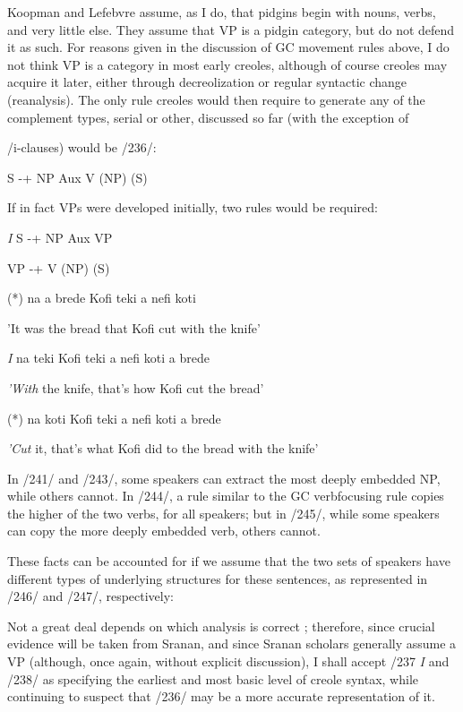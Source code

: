 Koopman and Lefebvre assume, as I do, that pidgins begin with
nouns, verbs, and very little else. They assume that VP is a pidgin category, but do not defend it as such. For reasons given in the dis\-cussion of GC movement rules above, I do not think VP is a category in most early creoles, although of course creoles may acquire it later, either through decreolization or regular syntactic change (reanalysis). The only rule creoles would then require to generate any of the comple\-ment types, serial or other, discussed so far (with the exception of

/i-clauses) would be /236/:

\ea\label{ex:236}
 S {}-+ NP Aux V (NP) (S)
\glt
\z

If in fact VPs were developed initially, two rules would be required:

\ea\label{ex:237}
 \textit{I} S {}-+ NP Aux VP
\glt
\z


\ea\label{ex:238}
 VP {}-+ V (NP) (S)
\glt
\z


\ea\label{ex:243}
 (*) na a brede Kofi teki a nefi koti
\glt
\z

'It was the bread that Kofi cut with the knife'

\ea\label{ex:244}
 \textit{I} na teki Kofi teki a nefi koti a brede
\glt
\z


\textit{'With} the knife, that's how Kofi cut the bread'

\ea\label{ex:245}
 (*) na koti Kofi teki a nefi koti a brede
\glt
\z

\textit{'Cut} it, that's what Kofi did to the bread with the knife'

In /241/ and /243/, some speakers can extract the most deeply embed\-ded NP, while others cannot. In /244/, a rule similar to the GC verb\-focusing rule copies the higher of the two verbs, for all speakers; but in /245/, while some speakers can copy the more deeply embedded verb, others cannot.

These facts can be accounted for if we assume that the two sets of speakers have different types of underlying structures for these sentences, as represented in /246/ and /247/, respectively:

Not a great deal depends on which analysis is correct ; therefore, since crucial evidence will be taken from Sranan, and since Sranan scholars generally assume a VP (although, once again, without explicit discussion), I shall accept /237 \textit{I} and /238/ as specifying the earliest and most basic level of creole syntax, while continuing to suspect that
/236/ may be a more accurate representation of it.

